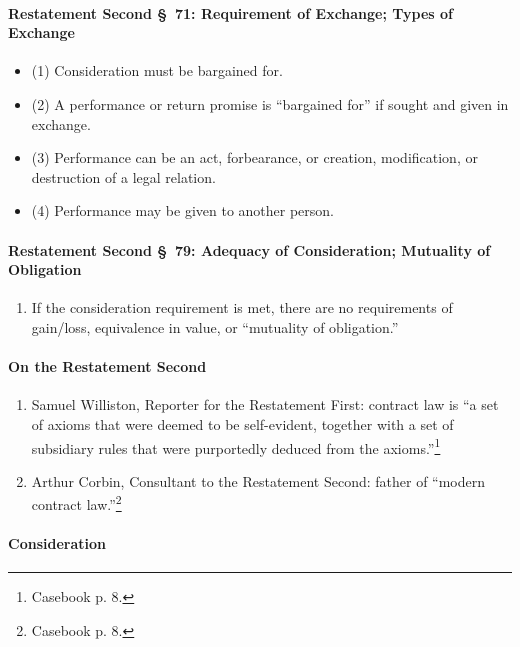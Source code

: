 \paragraph{Restatement Second \S\ 71: Requirement of Exchange; Types of 
Exchange}

\begin{itemize}
    \item (1) Consideration must be bargained for. 
    \item (2) A performance or return promise is ``bargained for'' if sought and given in exchange.
    \item (3) Performance can be an act, forbearance, or creation, 
    modification, or destruction of a legal relation.
    \item (4) Performance may be given to another person.
\end{itemize}

\paragraph{Restatement Second \S\ 79: Adequacy of Consideration; Mutuality 
of Obligation}

\begin{enumerate}
    \item If the consideration requirement is met, there are no requirements 
    of gain/loss, equivalence in value, or ``mutuality of obligation.''
\end{enumerate}

\paragraph{On the Restatement Second}

\begin{enumerate}
    \item Samuel Williston, Reporter for the Restatement First: contract law 
    is ``a set of axioms that were deemed to be self-evident, together with a 
    set of subsidiary rules that were purportedly deduced from the 
    axioms.''\footnote{Casebook p. 8.}
    \item Arthur Corbin, Consultant to the Restatement Second: father of 
    ``modern contract law.''\footnote{Casebook p. 8.}
\end{enumerate}

\paragraph{Consideration}

